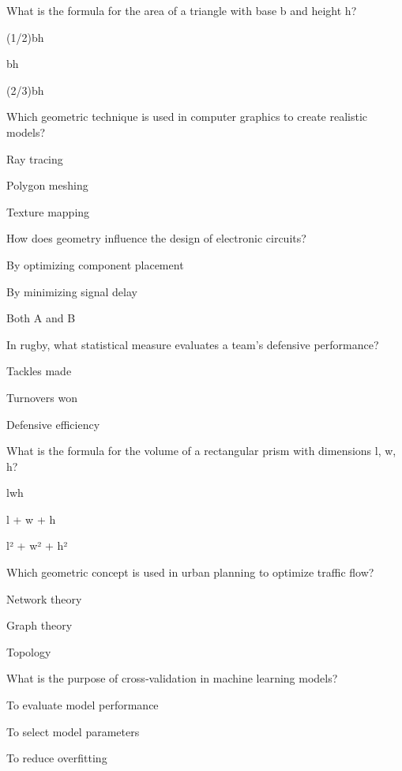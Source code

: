 \begin{enhancedmcq}{What is the formula for the area of a triangle with base b and height h?}
\item (1/2)bh
\item bh
\item (2/3)bh

\end{enhancedmcq}
\begin{enhancedmcq}{Which geometric technique is used in computer graphics to create realistic models?}
\item Ray tracing
\item Polygon meshing
\item Texture mapping

\end{enhancedmcq}
\begin{enhancedmcq}{How does geometry influence the design of electronic circuits?}
\item By optimizing component placement
\item By minimizing signal delay
\item Both A and B

\end{enhancedmcq}
\begin{enhancedmcq}{In rugby, what statistical measure evaluates a team's defensive performance?}
\item Tackles made
\item Turnovers won
\item Defensive efficiency

\end{enhancedmcq}
\begin{enhancedmcq}{What is the formula for the volume of a rectangular prism with dimensions l, w, h?}
\item lwh
\item l + w + h
\item l² + w² + h²

\end{enhancedmcq}
\begin{enhancedmcq}{Which geometric concept is used in urban planning to optimize traffic flow?}
\item Network theory
\item Graph theory
\item Topology

\end{enhancedmcq}
\begin{enhancedmcq}{What is the purpose of cross‑validation in machine learning models?}
\item To evaluate model performance
\item To select model parameters
\item To reduce overfitting

\end{enhancedmcq}
